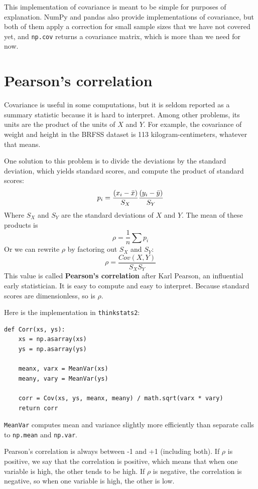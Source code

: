 \documentclass[12pt]{book}
\begin{document}
This implementation of covariance is meant to be simple for purposes
of explanation.  NumPy and pandas also provide implementations of
covariance, but both of them apply a correction for small sample sizes
that we have not covered yet, and \verb"np.cov" returns a covariance
matrix, which is more than we need for now.


\section{Pearson's correlation}

Covariance is useful in some computations, but it is seldom reported
as a summary statistic because it is hard to interpret.  Among other
problems, its units are the product of the units of $X$ and $Y$.  For
example, the covariance of weight and height in the BRFSS dataset is
113 kilogram-centimeters, whatever that means.

One solution to this problem is to divide the deviations by the standard
deviation, which yields standard scores, and compute the product of
standard scores:
%
\[ p_i = \frac{(x_i - \bar{x})}{S_X} \frac{(y_i - \bar{y})}{S_Y} \]
%
Where $S_X$ and $S_Y$ are the standard deviations of $X$ and $Y$.
The mean of these products is 
%
\[ \rho = \frac{1}{n} \sum p_i \]
%
Or we can rewrite $\rho$ by factoring out $S_X$ and
$S_Y$:
%
\[ \rho = \frac{Cov(X,Y)}{S_X S_Y} \]
%
This value is called {\bf Pearson's correlation} after Karl Pearson,
an influential early statistician.  It is easy to compute and easy to
interpret.  Because standard scores are dimensionless, so is $\rho$.

Here is the implementation in \verb"thinkstats2":

\begin{verbatim}
def Corr(xs, ys):
    xs = np.asarray(xs)
    ys = np.asarray(ys)

    meanx, varx = MeanVar(xs)
    meany, vary = MeanVar(ys)

    corr = Cov(xs, ys, meanx, meany) / math.sqrt(varx * vary)
    return corr
\end{verbatim}

\verb"MeanVar" computes mean and variance slightly more efficiently
than separate calls to \verb"np.mean" and \verb"np.var".

Pearson's correlation is always between -1 and +1 (including both).
If $\rho$ is positive, we say that the correlation is positive,
which means that when one variable is high, the other tends to be
high.  If $\rho$ is negative, the correlation is negative, so
when one variable is high, the other is low.
\end{document}
